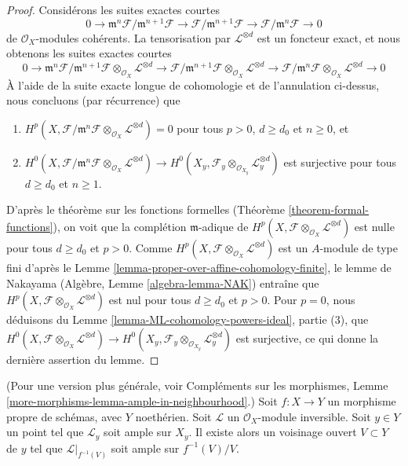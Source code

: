 \begin{proof}
\medskip\noindent
Considérons les suites exactes courtes
$$
0 \to \mathfrak m^n\mathcal{F}/\mathfrak m^{n + 1} \mathcal{F}
\to \mathcal{F}/\mathfrak m^{n + 1} \mathcal{F}
\to \mathcal{F}/\mathfrak m^n \mathcal{F} \to 0
$$
de $\mathcal{O}_X$-modules cohérents. La tensorisation par $\mathcal{L}^{\otimes d}$
est un foncteur exact, et nous obtenons les suites exactes courtes
$$
0 \to
\mathfrak m^n\mathcal{F}/\mathfrak m^{n + 1} \mathcal{F}
\otimes_{\mathcal{O}_X} \mathcal{L}^{\otimes d}
\to \mathcal{F}/\mathfrak m^{n + 1} \mathcal{F}
\otimes_{\mathcal{O}_X} \mathcal{L}^{\otimes d}
\to \mathcal{F}/\mathfrak m^n \mathcal{F}
\otimes_{\mathcal{O}_X} \mathcal{L}^{\otimes d} \to 0
$$
À l'aide de la suite exacte longue de cohomologie et de l'annulation ci-dessus,
nous concluons (par récurrence) que
\begin{enumerate}
\item $H^p(X, \mathcal{F}/\mathfrak m^n \mathcal{F}
\otimes_{\mathcal{O}_X} \mathcal{L}^{\otimes d}) = 0$
pour tous $p > 0$, $d \geq d_0$ et $n \geq 0$, et
\item $H^0(X, \mathcal{F}/\mathfrak m^n \mathcal{F}
\otimes_{\mathcal{O}_X} \mathcal{L}^{\otimes d}) \to
H^0(X_y, \mathcal{F}_y \otimes_{\mathcal{O}_{X_y}} \mathcal{L}_y^{\otimes d})$
est surjective pour tous $d \geq d_0$ et $n \geq 1$.
\end{enumerate}
D'après le théorème sur les fonctions formelles (Théorème \ref{theorem-formal-functions}),
on voit que la complétion $\mathfrak m$-adique de
$H^p(X, \mathcal{F} \otimes_{\mathcal{O}_X} \mathcal{L}^{\otimes d})$
est nulle pour tous $d \geq d_0$ et $p > 0$.
Comme $H^p(X, \mathcal{F} \otimes_{\mathcal{O}_X} \mathcal{L}^{\otimes d})$
est un $A$-module de type fini d'après le
Lemme \ref{lemma-proper-over-affine-cohomology-finite},
le lemme de Nakayama (Algèbre, Lemme \ref{algebra-lemma-NAK}) entraîne que
$H^p(X, \mathcal{F} \otimes_{\mathcal{O}_X} \mathcal{L}^{\otimes d})$
est nul pour tous $d \geq d_0$ et $p > 0$.
Pour $p = 0$, nous déduisons du
Lemme \ref{lemma-ML-cohomology-powers-ideal}, partie (3),
que $H^0(X, \mathcal{F} \otimes_{\mathcal{O}_X} \mathcal{L}^{\otimes d}) \to
H^0(X_y, \mathcal{F}_y \otimes_{\mathcal{O}_{X_y}} \mathcal{L}_y^{\otimes d})$
est surjective, ce qui donne la dernière assertion du lemme.
\end{proof}

\begin{lemma}
\label{lemma-ample-in-neighbourhood}
(Pour une version plus générale, voir
Compléments sur les morphismes,
Lemme \ref{more-morphisms-lemma-ample-in-neighbourhood}.)
Soit $f : X \to Y$ un morphisme propre de schémas, avec $Y$ noethérien.
Soit $\mathcal{L}$ un $\mathcal{O}_X$-module inversible.
Soit $y \in Y$ un point tel que $\mathcal{L}_y$ soit ample
sur $X_y$. Il existe alors un voisinage ouvert $V \subset Y$
de $y$ tel que $\mathcal{L}|_{f^{-1}(V)}$ soit ample sur $f^{-1}(V)/V$.
\end{lemma}

